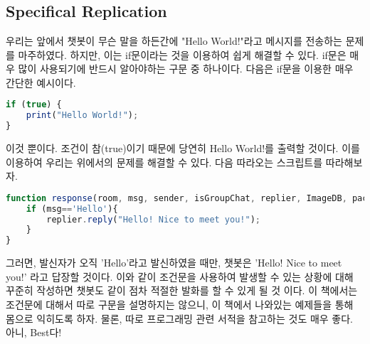 \documentclass[10pt,a4paper,final]{book}
\begin{document}
\chapter{}
\section{Specifical Replication}
우리는 앞에서 챗봇이 무슨 말을 하든간에 "Hello World!"라고 메시지를 전송하는
문제를 마주하였다. 하지만, 이는 if문이라는 것을 이용하여 쉽게 해결할 수 있다.
if문은 매우 많이 사용되기에 반드시 알아야하는 구문 중 하나이다.
다음은 if문을 이용한 매우 간단한 예시이다.
\begin{lstlisting}[language=JavaScript,escapeinside=~~]
if (true) {
    print("Hello World!");
}
\end{lstlisting}
이것 뿐이다. 조건이 참(true)이기 때문에 당연히 Hello World!를 출력할 것이다.
이를 이용하여 우리는 위에서의 문제를 해결할 수 있다.
다음 따라오는 스크립트를 따라해보자.
\begin{lstlisting}[language=JavaScript,escapeinside=~~]
function response(room, msg, sender, isGroupChat, replier, ImageDB, packageName, threadId){
    if (msg=='Hello'){
        replier.reply("Hello! Nice to meet you!");
    }
}
\end{lstlisting}
그러면, 발신자가 오직 'Hello'라고 발신하였을 때만, 챗봇은 'Hello! Nice to meet you!'
라고 답장할 것이다. 이와 같이 조건문을 사용하여 발생할 수 있는 상황에 대해 꾸준히 작성하면
챗봇도 같이 점차 적절한 발화를 할 수 있게 될 것 이다. 이 책에서는 조건문에 대해서 따로 구문을
설명하지는 않으니, 이 책에서 나와있는 예제들을 통해 몸으로 익히도록 하자. 물론, 따로 프로그래밍
관련 서적을 참고하는 것도 매우 좋다. 아니, Best다!
\end{document}
